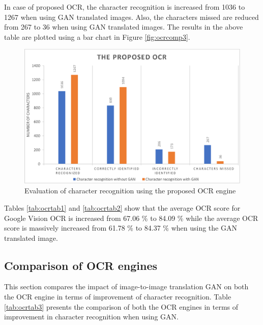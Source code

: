 In case of proposed OCR, the character recognition is increased from 1036 to 1267 when using GAN translated images. Also, the characters missed are reduced from 267 to 36 when using GAN translated images. The results in the above table are plotted using a bar chart in Figure \ref{fig:ocrcomp3}.

	
\begin{figure}[H]
\centering
\includegraphics[width=5in]{images/ocrcomp4.eps}
\caption{Evaluation of character recognition using the proposed OCR engine}
\label{fig:ocrcomp4}
\end{figure}

Tables \ref{tab:ocrtab1} and \ref{tab:ocrtab2} show that the average OCR score for Google Vision OCR is increased from 67.06 \% to 84.09 \% while the average OCR score is massively increased from 61.78 \% to 84.37 \% when using the GAN translated image.

\subsection{Comparison of OCR engines}
This section compares the impact of image-to-image translation GAN on both the OCR engine in terms of improvement of character recognition. Table \ref{tab:ocrtab3} presents the comparison of both the OCR engines in terms of improvement in character recognition when using GAN. 
\newline

